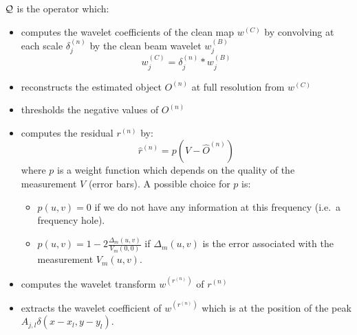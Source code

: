 \documentclass[11pt,a4paper]{article}
\begin{document}
${\cal Q}$ is the  operator which:
\begin{itemize}
\item computes the  wavelet coefficients of the clean map $w^{(C)}$ by
convolving at each scale $\delta_j^{(n)}$ by the clean beam wavelet $w_j^{(B)}$
\[w_j^{(C)} = \delta_j^{(n)} * w_j^{(B)}\] 
\item reconstructs  the estimated object $O^{(n)}$ at  full resolution
from $w^{(C)}$
\item thresholds  the negative values of $O^{(n)}$
\item computes  the residual $r^{(n)}$ by:
\[\hat{r}^{(n)} = p(V - \hat{O}^{(n)})\]
 where $p$ is a weight function which depends on the quality of the
measurement $V$ (error bars). A possible choice for $p$ is:
\begin{itemize}
\item $p(u,v) = 0$ if we do not have any information at this frequency (i.e.\ 
a frequency hole).
\item $p(u,v) = 1 - 2 \frac{\Delta_m(u,v)}{V_m(0,0)}$ if $\Delta_m(u,v)$
is the error associated with the measurement $V_m(u,v)$.
\end{itemize}
\item computes the wavelet transform $w^{(r^{(n)})}$ of $r^{(n)}$ 
\item extracts the wavelet coefficient of $w^{(r^{(n)})}$ which is at 
the position of the peak $A_{j,l} \delta(x - x_l, y - y_l)$.
\end{itemize}

\bigskip
\end{document}

